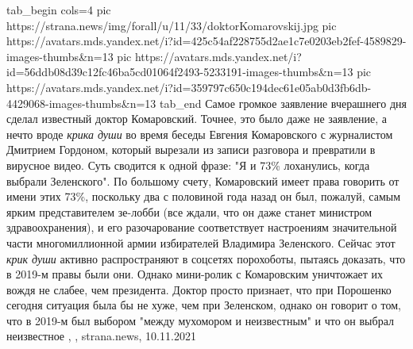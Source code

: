 \ifcmt
  tab_begin cols=4
     pic https://strana.news/img/forall/u/11/33/doktorKomarovskij.jpg
     pic https://avatars.mds.yandex.net/i?id=425c54af228755d2ae1c7e0203eb2fef-4589829-images-thumbs&n=13
		 pic https://avatars.mds.yandex.net/i?id=56ddb08d39c12fc46ba5cd01064f2493-5233191-images-thumbs&n=13
		 pic https://avatars.mds.yandex.net/i?id=359797c650c194dec61e05ab0d3fb6db-4429068-images-thumbs&n=13
  tab_end
\fi
Самое громкое заявление вчерашнего дня сделал известный доктор Комаровский.
Точнее, это было даже не заявление, а нечто вроде \emph{крика души} во время беседы
Евгения Комаровского с журналистом Дмитрием Гордоном, который вырезали из
записи разговора и превратили в вирусное видео.  Суть сводится к одной фразе:
"Я и 73\% лоханулись, когда выбрали Зеленского". По большому счету, Комаровский
имеет права говорить от имени этих 73\%, поскольку два с половиной года назад он
был, пожалуй, самым ярким представителем зе-лобби (все ждали, что он даже
станет министром здравоохранения), и его разочарование соответствует
настроениям значительной части многомиллионной армии избирателей Владимира
Зеленского.  Сейчас этот \emph{крик души} активно распространяют в соцсетях
порохоботы, пытаясь доказать, что в 2019-м правы были они. Однако мини-ролик с
Комаровским уничтожает их вождя не слабее, чем президента. Доктор просто
признает, что при Порошенко сегодня ситуация была бы не хуже, чем при
Зеленском, однако он говорит о том, что в 2019-м был выбором "между мухомором и
неизвестным" и что он выбрал неизвестное
, 
, strana.news, 10.11.2021
